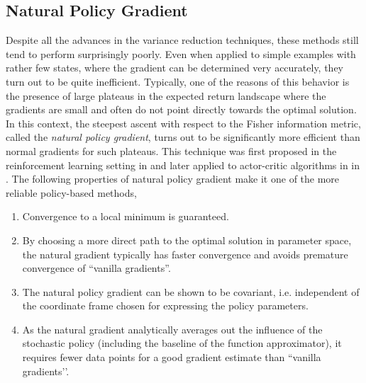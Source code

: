 \subsection{Natural Policy Gradient}
Despite all the advances in the variance reduction techniques, these methods still tend to perform surprisingly poorly. Even when applied to simple examples with rather few states, where the gradient can be determined very accurately, they turn out to be quite inefficient. Typically, one of the reasons of this behavior is the presence of large plateaus in the expected return landscape where the gradients are small and often do not point directly towards the optimal solution. In this context, the steepest ascent with respect to the Fisher information metric, called the \emph{natural policy gradient}, turns out to be significantly more efficient than normal gradients for such
plateaus. This technique was first proposed in the reinforcement learning setting in \cite{kakade2001natural} and later applied to actor-critic algorithms in in \cite{peters2008reinforcement}. The following properties of natural policy gradient make it one of the more reliable policy-based methods,
\begin{enumerate}[label={\roman*)}]
	\item Convergence to a local minimum is guaranteed.
	\item By choosing a more direct path to the optimal solution in parameter space, the natural gradient typically has faster convergence and avoids premature convergence of ``vanilla gradients''.
	\item  The natural policy gradient can be shown to be covariant, i.e. independent of the coordinate frame chosen for expressing the policy parameters.
	\item As the natural gradient analytically averages out the influence of the stochastic policy (including the baseline of the function approximator), it requires fewer data points for a good gradient estimate than ``vanilla gradients’'.
\end{enumerate}

